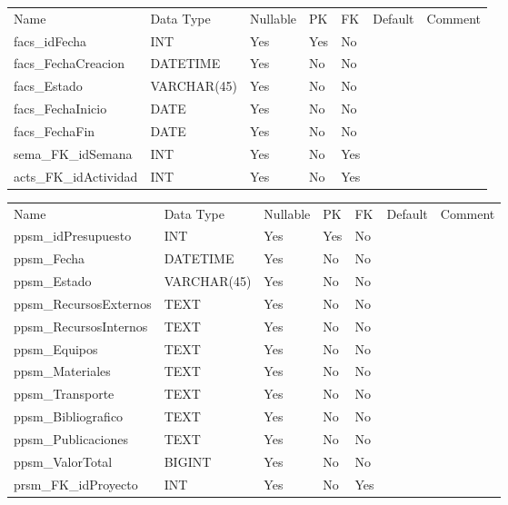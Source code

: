 			\begin{center}
				\begin{tabular}{ |l|l|l|l|l|l|l| }
					\hline
					Name & Data Type & Nullable & PK & FK & Default & Comment \\
					facs_idFecha & INT & Yes & Yes & No &  & \\ \hline 
facs_FechaCreacion & DATETIME & Yes & No & No &  & \\ \hline 
facs_Estado & VARCHAR(45) & Yes & No & No &  & \\ \hline 
facs_FechaInicio & DATE & Yes & No & No &  & \\ \hline 
facs_FechaFin & DATE & Yes & No & No &  & \\ \hline 
sema_FK_idSemana & INT & Yes & No & Yes &  & \\ \hline 
acts_FK_idActividad & INT & Yes & No & Yes &  & \\ \hline 

				\end{tabular}
			\end{center}
		

			\begin{center}
				\begin{tabular}{ |l|l|l|l|l|l|l| }
					\hline
					Name & Data Type & Nullable & PK & FK & Default & Comment \\
					ppsm_idPresupuesto & INT & Yes & Yes & No &  & \\ \hline 
ppsm_Fecha & DATETIME & Yes & No & No &  & \\ \hline 
ppsm_Estado & VARCHAR(45) & Yes & No & No &  & \\ \hline 
ppsm_RecursosExternos & TEXT & Yes & No & No &  & \\ \hline 
ppsm_RecursosInternos & TEXT & Yes & No & No &  & \\ \hline 
ppsm_Equipos & TEXT & Yes & No & No &  & \\ \hline 
ppsm_Materiales & TEXT & Yes & No & No &  & \\ \hline 
ppsm_Transporte & TEXT & Yes & No & No &  & \\ \hline 
ppsm_Bibliografico & TEXT & Yes & No & No &  & \\ \hline 
ppsm_Publicaciones & TEXT & Yes & No & No &  & \\ \hline 
ppsm_ValorTotal & BIGINT & Yes & No & No &  & \\ \hline 
prsm_FK_idProyecto & INT & Yes & No & Yes &  & \\ \hline 

				\end{tabular}
			\end{center}
		

